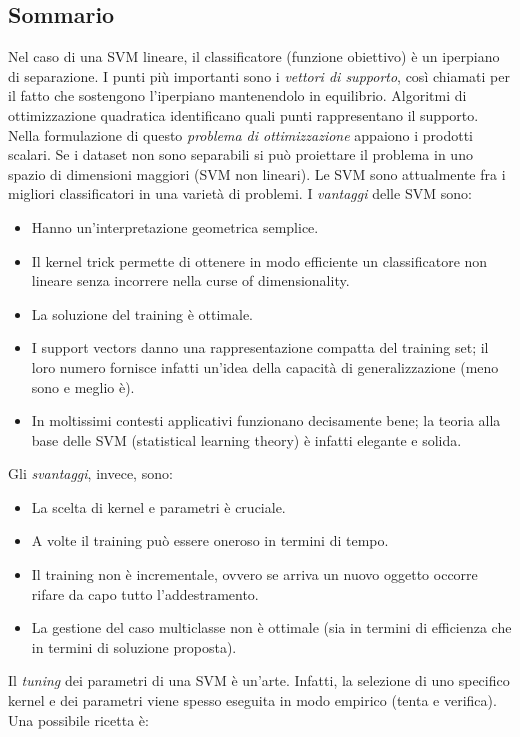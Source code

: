 \documentclass[a4paper,oneside,titlepage]{book}
\begin{document}
\subsection{Sommario}
Nel caso di una SVM lineare, il classificatore (funzione obiettivo) è un iperpiano di separazione. I punti più importanti sono i \textit{vettori di supporto}, così chiamati per il fatto che sostengono l'iperpiano mantenendolo in equilibrio. Algoritmi di ottimizzazione quadratica identificano quali punti rappresentano il supporto. Nella formulazione di questo \textit{problema di ottimizzazione} appaiono i prodotti scalari. Se i dataset non sono separabili si può proiettare il problema in uno spazio di dimensioni maggiori (SVM non lineari).
\newpage
\noindent
Le SVM sono attualmente fra i migliori classificatori in una varietà di problemi. I \textit{vantaggi} delle SVM sono:
\begin{itemize}
    \item Hanno un'interpretazione geometrica semplice.
    \item Il kernel trick permette di ottenere in modo efficiente un classificatore non lineare senza incorrere nella curse of dimensionality.
    \item La soluzione del training è ottimale.
    \item I support vectors danno una rappresentazione compatta del training set; il loro numero fornisce infatti un'idea della capacità di generalizzazione (meno sono e meglio è).
    \item In moltissimi contesti applicativi funzionano decisamente bene; la teoria alla base delle SVM (statistical learning theory) è infatti elegante e solida.
\end{itemize}
Gli \textit{svantaggi}, invece, sono:
\begin{itemize}
    \item La scelta di kernel e parametri è cruciale.
    \item A volte il training può essere oneroso in termini di tempo.
    \item Il training non è incrementale, ovvero se arriva un nuovo oggetto occorre rifare da capo tutto l'addestramento.
    \item La gestione del caso multiclasse non è ottimale (sia in termini di efficienza che in termini di soluzione proposta).
\end{itemize}
Il \textit{tuning} dei parametri di una SVM è un'arte. Infatti, la selezione di uno specifico kernel e dei parametri viene spesso eseguita in modo empirico (tenta e verifica). Una possibile ricetta è:
\end{document}

